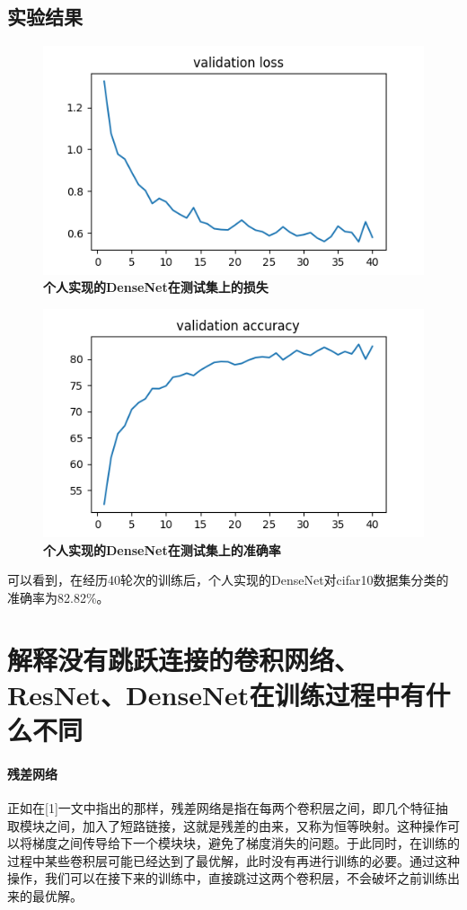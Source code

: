 \documentclass{article}
\begin{document}
\subsection{实验结果}
\begin{figure}[H]
  \centering
  \includegraphics{validation_loss.png}
  \caption{\textbf{个人实现的DenseNet在测试集上的损失}}
\end{figure}
\begin{figure}[H]
  \centering
  \includegraphics{validation_accuracy.png}
  \caption{\textbf{个人实现的DenseNet在测试集上的准确率}}
\end{figure}
可以看到，在经历40轮次的训练后，个人实现的DenseNet对cifar10数据集分类的准确率为82.82\%。

\section{解释没有跳跃连接的卷积网络、ResNet、DenseNet在训练过程中有什么不同}
\paragraph*{残差网络} 正如在[1]一文中指出的那样，残差网络是指在每两个卷积层之间，即几个特征抽取模块之间，加入了短路链接，这就是残差的由来，又称为恒等映射。这种操作可以将梯度之间传导给下一个模块块，避免了梯度消失的问题。于此同时，在训练的过程中某些卷积层可能已经达到了最优解，此时没有再进行训练的必要。通过这种操作，我们可以在接下来的训练中，直接跳过这两个卷积层，不会破坏之前训练出来的最优解。
\end{document}
